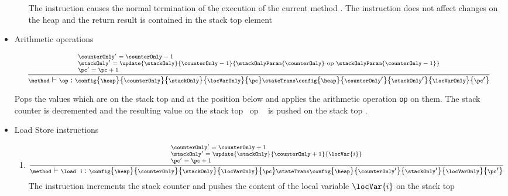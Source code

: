 \begin{itemize}
\begin{enumerate}
	    The instruction causes the normal termination of the execution of the current method \methodd.
	    The instruction does not affect changes on the heap \heap and the return result is contained in
	    the stack top element \stackOnlyParam{\counterOnly}
      \end{enumerate}

  \item Arithmetic operations 	
        
	   $${\scriptsize \frac{ 
	   \begin{array}{l}
	   \counterOnly' = \counterOnly - 1 \\
	   \stackOnly' = \update{\stackOnly} {\counterOnly-1}{\stackOnlyParam{\counterOnly} \ \rm{op} \ \stackOnlyParam{\counterOnly-1}} \\
	   \pc' = \pc + 1
	   \end{array}}
		   {\method \vdash  \op :\config{\heap}{\counterOnly}{\stackOnly}{\locVarOnly}{\pc} 
		          \stateTrans 
                          \config{\heap}{\counterOnly'}{\stackOnly' }{\locVarOnly}{\pc'} } } $$ 
		 
 
       Pops the values which are on the stack top \stackOnlyParam{\counterOnly}  and   at the position below and applies the arithmetic operation \texttt{op}
       on them. The stack counter is decremented and  the resulting  value on the stack top  \ \rm{op} \ \stackOnlyParam{\counterOnly} is pushed on the stack
       top  . 

  \item Load Store instructions

      \begin{enumerate}
    
	\item \load
	$${\scriptsize \frac{ \begin{array}{l}
	                \counterOnly' = \counterOnly + 1\\
			\stackOnly' = \update{\stackOnly}{\counterOnly +  1}{ \locVar{i} } \\
			\pc' = \pc + 1
	          \end{array}
	    } 
	    {\method \vdash \load \ \mbox{ \rm i}  : \config{\heap}{\counterOnly}{\stackOnly}{\locVarOnly}{\pc} 
		  \stateTrans 
                  \config{\heap}{\counterOnly'}{\stackOnly'}{\locVarOnly}{\pc'}  } } $$ 
            The instruction increments the stack counter  \counterOnly and pushes
	    the content of the local variable $\locVar{i}$ on the stack top 
	    

\end{enumerate}
\end{itemize}
